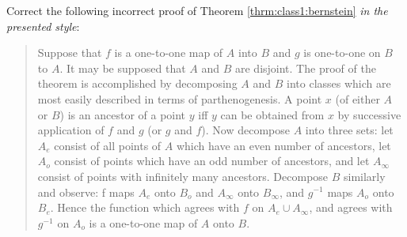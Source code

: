 \begin{exercise}
    Correct the following incorrect proof of Theorem \ref{thrm:class1:bernstein} \emph{in the presented style}:
    \begin{quote}
Suppose that $f$ is a one-to-one map of $A$ into $B$ and $g$ is
one-to-one on $B$ to $A$. It may be supposed that $A$ and $B$ are disjoint. The proof of the theorem is accomplished by decomposing $A$ and $B$ into classes which are most easily described in terms of parthenogenesis. A point $x$ (of either $A$ or $B$) is an ancestor of a point $y$ iff $y$ can be obtained from $x$ by successive application of $f$ and $g$ (or $g$ and $f$). Now decompose $A$ into three sets:
let $A_e$ consist of all points of $A$ which have an even number of ancestors, let $A_o$ consist of points which have an odd number of ancestors, and let $A_{\infty}$ consist of points with infinitely many ancestors. Decompose $B$ similarly and observe: f maps $A_e$ onto
$B_o$ and $A_{\infty}$ onto  $B_{\infty}$, and $g^{-1}$ maps $A_o$ onto $B_e$. Hence the function which agrees with $f$ on $A_e\cup A_{\infty}$, and agrees with $g^{-1}$ on $A_o$ is a one-to-one map of $A$ onto $B$.
    \end{quote}
\end{exercise}

\newpage
